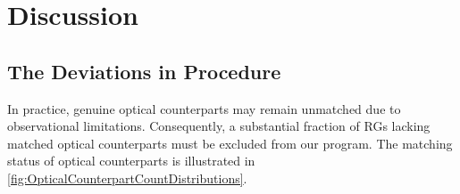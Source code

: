 \documentclass{aa}
\begin{document}
        


\section{Discussion}\label{sec:Discussion}

\subsection{The Deviations in Procedure}\label{sec:Section5_1}
In practice, genuine optical counterparts may remain unmatched due to observational limitations. Consequently, a substantial fraction of RGs lacking matched optical counterparts must be excluded from our program. The matching status of optical counterparts is illustrated in \autoref{fig:OpticalCounterpartCountDistributions}.
\end{document}
